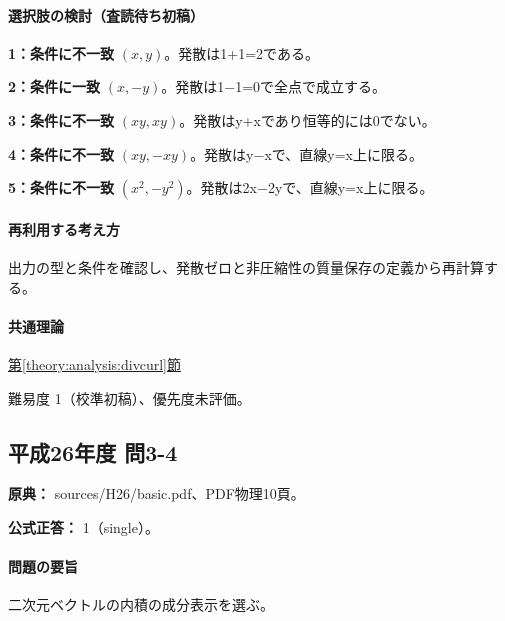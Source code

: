 \paragraph{選択肢の検討（査読待ち初稿）}\mbox{}\par

\noindent\textbf{1：条件に不一致} \((x,y)\)。発散は1+1=\allowbreak{}2である。\par

\noindent\textbf{2：条件に一致} \((x,-y)\)。発散は1−1=\allowbreak{}0で全点で成立する。\par

\noindent\textbf{3：条件に不一致} \((xy,xy)\)。発散はy+xであり恒等的には0でない。\par

\noindent\textbf{4：条件に不一致} \((xy,-xy)\)。発散はy−xで、直線y=\allowbreak{}x上に限る。\par

\noindent\textbf{5：条件に不一致} \((x^2,-y^2)\)。発散は2x−2yで、直線y=\allowbreak{}x上に限る。\par

\paragraph{再利用する考え方} 出力の型と条件を確認し、発散ゼロと非圧縮性の質量保存の定義から再計算する。

\paragraph{共通理論} \hyperref[theory:analysis:divcurl]{第\ref*{theory:analysis:divcurl}節}

\par 難易度 1（校準初稿）、優先度未評価。

\subsection{平成26年度 問3-4}
\label{q:h26-reg-basic-3-4}

\noindent\textbf{原典：} sources/H26/basic.pdf、PDF物理10頁。

\textbf{公式正答：} 1（single）。

\paragraph{問題の要旨} 二次元ベクトルの内積の成分表示を選ぶ。

